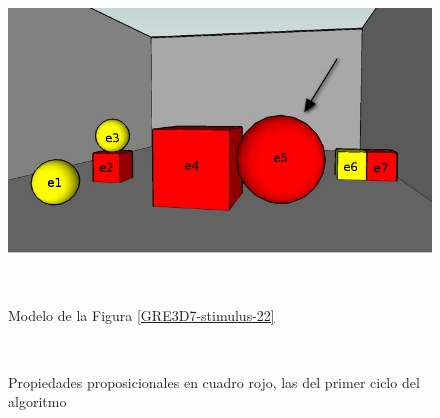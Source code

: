 \begin{figure}[ht]
\begin{minipage}[b]{0.45\linewidth}
\centering
\includegraphics[width=\textwidth]{images/22.jpg}
\vspace*{1cm}
\label{GRE3D7-stimulus-22}
\end{minipage}
\begin{minipage}[b]{0.6\linewidth}
\centering
\\[0pt]
\caption{Modelo de la Figura \ref{GRE3D7-stimulus-22}}
\label{fig-modelo}
\end{minipage}
\end{figure}

\begin{figure}[ht]
\begin{center}
\\[0pt]
\caption{Propiedades proposicionales en cuadro rojo, las del primer ciclo del algoritmo}
\label{fig-modelo2}
\end{center}
\end{figure}

